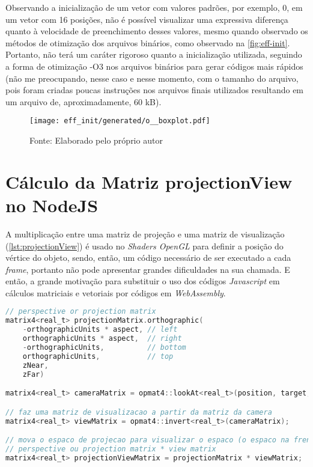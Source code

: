 \documentclass{article}
\begin{document}
Observando a inicialização de um vetor com valores padrões, por exemplo, 0, em um vetor com 16 posições, não é possível visualizar uma expressiva diferença quanto à velocidade de preenchimento desses valores, mesmo quando observado os métodos de otimização dos arquivos binários, como observado na \autoref{fig:eff-init}. Portanto, não terá um caráter rigoroso quanto a inicialização utilizada, seguindo a forma de otimização -O3 nos arquivos binários para gerar códigos mais rápidos (não me preocupando, nesse caso e nesse momento, com o tamanho do arquivo, pois foram criadas poucas instruções nos arquivos finais utilizados resultando em um arquivo de, aproximadamente, 60 kB).

\begin{figure}[H]
    \centering
    
    \vspace{5pt}
    \texttt{[image: eff\_init/generated/o\_\_boxplot.pdf]}
    \vspace{5pt}
    {\par\small Fonte: Elaborado pelo próprio autor}
    
    \label{fig:eff-init}
\end{figure}

\section*{Cálculo da Matriz projectionView no NodeJS}

A multiplicação entre uma matriz de projeção e uma matriz de visualização (\autoref{lst:projectionView}) é usado no \textit{Shaders OpenGL} para definir a posição do vértice do objeto, sendo, então, um código necessário de ser executado a cada \textit{frame}, portanto não pode apresentar grandes dificuldades na sua chamada. E então, a grande motivação para substituir o uso dos códigos \textit{Javascript} em cálculos matriciais e vetoriais por códigos em \textit{WebAssembly}.

\begin{lstlisting}[language=c,style=m_lststyle,label=lst:projectionView,caption=Cálculo da Matriz projectionView]
// perspective or projection matrix
matrix4<real_t> projectionMatrix.orthographic(
    -orthographicUnits * aspect, // left
    orthographicUnits * aspect,  // right
    -orthographicUnits,          // bottom
    orthographicUnits,           // top
    zNear,
    zFar)

matrix4<real_t> cameraMatrix = opmat4::lookAt<real_t>(position, target, yAxis);

// faz uma matriz de visualizacao a partir da matriz da camera
matrix4<real_t> viewMatrix = opmat4::invert<real_t>(cameraMatrix);

// mova o espaco de projecao para visualizar o espaco (o espaco na frente da camera)
// perspective ou projection matrix * view matrix
matrix4<real_t> projectionViewMatrix = projectionMatrix * viewMatrix;
\end{lstlisting}
\end{document}
